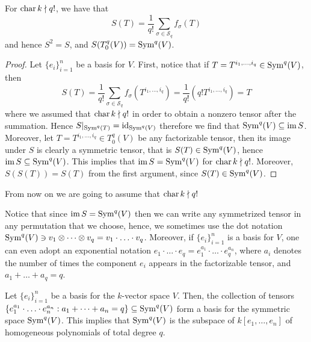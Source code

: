 \begin{proposition}
  For \(\operatorname{char} k \nmid q!\), we have that
  \[
    S(T) = \frac{1}{q!} \sum_{\sigma \in \mathcal S_q} f_\sigma(T)
  \] 
  and hence \(S^2 = S\), and \(S(T_0^q(V)) = \operatorname{Sym}^q(V)\).
\end{proposition}

\begin{proof}
  Let \(\{e_i\}_{i=1}^n\) be a basis for \(V\). First, notice that if \(T =
  T^{i_1, \dots, i_q} \in \operatorname{Sym}^q(V)\),
  then
  \[
    S(T) = \frac{1}{q!} \sum_{\sigma \in \mathcal S_q} f_\sigma(T^{i_1, \dots,
    i_q}) = \frac{1}{q!} (q! T^{i_1, \dots, i_q}) = T
  \] 
  where we assumed that \(\operatorname{char} k \nmid q!\) in order to obtain a nonzero tensor
  after the summation. Hence \(S|_{\operatorname{Sym}^q(T)} = \operatorname{id}_{\operatorname{Sym}^q(V)}\) therefore we
  find that \(\operatorname{Sym}^q(V) \subseteq \operatorname{im} S\). Moreover, let \(T = T^{i_1, \dots,
  i_q} \in T_0^q(V)\) be any factorizable tensor, then its image under \(S\) is
  clearly a symmetric tensor, that is \(S(T) \in \operatorname{Sym}^q(V)\), hence \(\operatorname{im} S
  \subseteq \operatorname{Sym}^q(V)\). This implies that \(\operatorname{im} S = \operatorname{Sym}^q(V)\) for \(\operatorname{char} k
  \nmid q!\). Moreover, \(S(S(T)) = S(T)\) from the first argument, since
  \(S(T) \in \operatorname{Sym}^q(V)\).
\end{proof}

\begin{remark}
  From now on we are going to assume that \(\operatorname{char} k \nmid q!\)
\end{remark}

\begin{notation}
  Notice that since \(\operatorname{im} S = \operatorname{Sym}^q(V)\) then we can write any symmetrized
  tensor in any permutation that we choose, hence, we sometimes use the dot
  notation \(\operatorname{Sym}^q(V) \ni v_1 \otimes \dots \otimes v_q = v_1 \cdot \ldots
  \cdot v_q\). Moreover, if \(\{e_i\}_{i=1}^n\) is a basis for \(V\), one can
  even adopt an exponential notation \(e_1 \cdot \ldots \cdot e_q = e_1^{a_1}
  \cdot \ldots \cdot e_q^{a_n}\), where \(a_i\) denotes the number of times the
  component \(e_i\) appears in the factorizable tensor, and \(a_1 + \dots + a_q
  = q\).
\end{notation}

\begin{proposition}
  \label{prop: basis for symmetric power}
  Let \(\{e_i\}_{i=1}^n\) be a basis for the \(k\)-vector space \(V\). Then, the
  collection of tensors \(\{e_1^{a_1} \cdot \ldots \cdot e_n^{a_n} : a_1 + \dots
  + a_n = q\} \subseteq \operatorname{Sym}^q(V)\) form a basis for the symmetric space
  \(\operatorname{Sym}^q(V)\). This implies that \(\operatorname{Sym}^q(V)\) is the subspace of \(k[e_1,
  \dots, e_n]\) of homogeneous polynomials of total degree \(q\).
\end{proposition}

